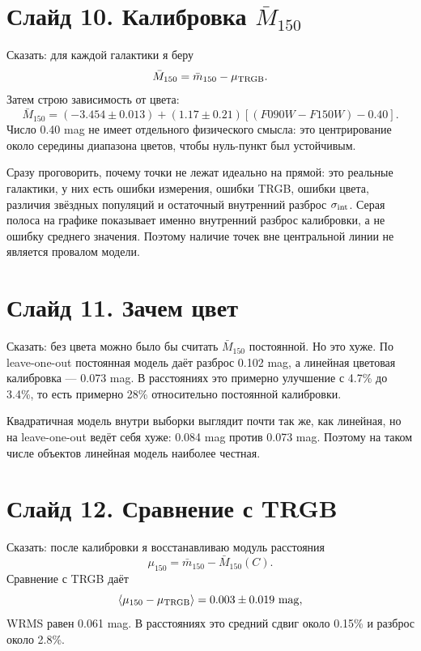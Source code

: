 \documentclass[12pt]{article}
\begin{document}
\section*{Слайд 10. Калибровка $\bar{M}_{150}$}

Сказать: для каждой галактики я беру
\begin{equation*}
    \bar{M}_{150}=\bar{m}_{150}-\mu_{\rm TRGB}.
\end{equation*}
Затем строю зависимость от цвета:
\begin{equation*}
    \bar{M}_{150}=(-3.454\pm0.013)+(1.17\pm0.21)[(F090W-F150W)-0.40].
\end{equation*}
Число 0.40 mag не имеет отдельного физического смысла: это центрирование около середины диапазона цветов, чтобы нуль-пункт был устойчивым.

Сразу проговорить, почему точки не лежат идеально на прямой: это реальные галактики, у них есть ошибки измерения, ошибки TRGB, ошибки цвета, различия звёздных популяций и остаточный внутренний разброс $\sigma_{\rm int}$. Серая полоса на графике показывает именно внутренний разброс калибровки, а не ошибку среднего значения. Поэтому наличие точек вне центральной линии не является провалом модели.

\section*{Слайд 11. Зачем цвет}

Сказать: без цвета можно было бы считать $\bar{M}_{150}$ постоянной. Но это хуже. По leave-one-out постоянная модель даёт разброс 0.102 mag, а линейная цветовая калибровка --- 0.073 mag. В расстояниях это примерно улучшение с 4.7\% до 3.4\%, то есть примерно 28\% относительно постоянной калибровки.

Квадратичная модель внутри выборки выглядит почти так же, как линейная, но на leave-one-out ведёт себя хуже: 0.084 mag против 0.073 mag. Поэтому на таком числе объектов линейная модель наиболее честная.

\section*{Слайд 12. Сравнение с TRGB}

Сказать: после калибровки я восстанавливаю модуль расстояния
\begin{equation*}
    \mu_{150}=\bar{m}_{150}-\bar{M}_{150}(C).
\end{equation*}
Сравнение с TRGB даёт
\begin{equation*}
    \langle\mu_{150}-\mu_{\rm TRGB}\rangle=0.003\pm0.019~\mathrm{mag},
\end{equation*}
WRMS равен 0.061 mag. В расстояниях это средний сдвиг около 0.15\% и разброс около 2.8\%.
\end{document}
